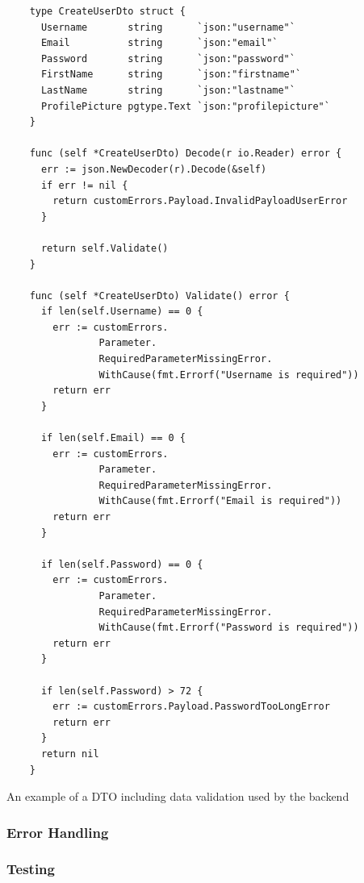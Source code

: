 \begin{listing}[htbp]
  \centering{}
  \begin{minipage}{0.7\textwidth}
  \begin{verbatim}
    type CreateUserDto struct {
      Username       string      `json:"username"`
      Email          string      `json:"email"`
      Password       string      `json:"password"`
      FirstName      string      `json:"firstname"`
      LastName       string      `json:"lastname"`
      ProfilePicture pgtype.Text `json:"profilepicture"`
    }

    func (self *CreateUserDto) Decode(r io.Reader) error {
      err := json.NewDecoder(r).Decode(&self)
      if err != nil {
        return customErrors.Payload.InvalidPayloadUserError
      }

      return self.Validate()
    }

    func (self *CreateUserDto) Validate() error {
      if len(self.Username) == 0 {
        err := customErrors.
                Parameter.
                RequiredParameterMissingError.
                WithCause(fmt.Errorf("Username is required"))
        return err
      }

      if len(self.Email) == 0 {
        err := customErrors.
                Parameter.
                RequiredParameterMissingError.
                WithCause(fmt.Errorf("Email is required"))
        return err
      }

      if len(self.Password) == 0 {
        err := customErrors.
                Parameter.
                RequiredParameterMissingError.
                WithCause(fmt.Errorf("Password is required"))
        return err
      }

      if len(self.Password) > 72 {
        err := customErrors.Payload.PasswordTooLongError
        return err
      }
      return nil
    }

  \end{verbatim}
  \end{minipage}
  \caption{An example of a DTO including data validation used by the backend}
  \label{listing:dto_example}
\end{listing}

\subsubsection{Error Handling}

\subsubsection{Testing}
